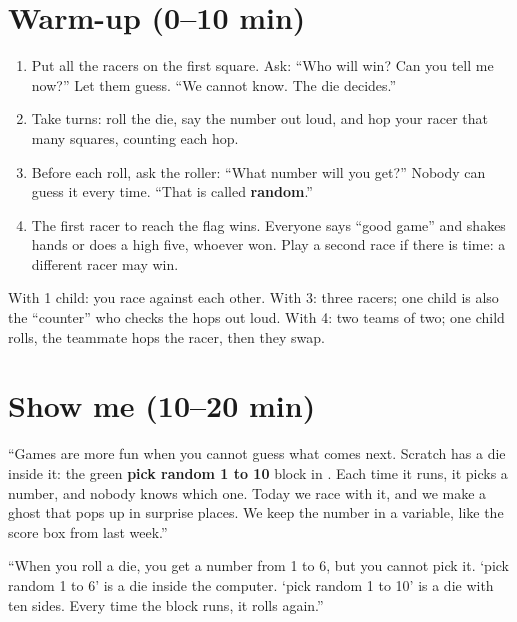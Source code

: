 \section{Warm-up (0--10 min)}
\begin{unplugged}
\begin{enumerate}[leftmargin=1.4em,itemsep=1pt]
  \item Put all the racers on the first square. Ask: \enquote{Who will win? Can you tell me now?} Let them guess. \enquote{We cannot know. The die decides.}
  \item Take turns: roll the die, say the number out loud, and hop your racer that many squares, counting each hop.
  \item Before each roll, ask the roller: \enquote{What number will you get?} Nobody can guess it every time. \enquote{That is called \textbf{random}.}
  \item The first racer to reach the flag wins. Everyone says \enquote{good game} and shakes hands or does a high five, whoever won. Play a second race if there is time: a different racer may win.
\end{enumerate}
With 1 child: you race against each other. With 3: three racers; one child is also the \enquote{counter} who checks the hops out loud. With 4: two teams of two; one child rolls, the teammate hops the racer, then they swap.
\end{unplugged}

\section{Show me (10--20 min)}
\begin{teacherscript}
\enquote{Games are more fun when you cannot guess what comes next. Scratch has a die inside it: the green \textbf{pick random 1 to 10} block in . Each time it runs, it picks a number, and nobody knows which one. Today we race with it, and we make a ghost that pops up in surprise places. We keep the number in a variable, like the score box from last week.}
\end{teacherscript}

\begin{analogy}
\enquote{When you roll a die, you get a number from 1 to 6, but you cannot pick it. \enquote{pick random 1 to 6} is a die inside the computer. \enquote{pick random 1 to 10} is a die with ten sides. Every time the block runs, it rolls again.}
\end{analogy}

